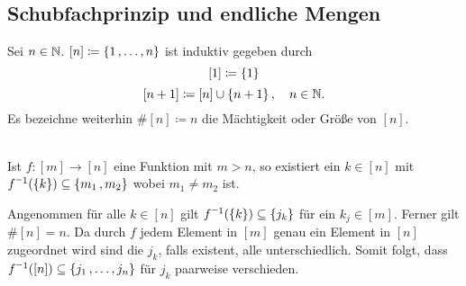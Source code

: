 \documentclass[../ana1.tex]{subfiles}
\begin{document}
\subsection{Schubfachprinzip und endliche Mengen}

\begin{notation}
	Sei \(n \in \mathbb{N} \). \([n] \coloneqq \{1 \operatorname{,} \ldots \operatorname{,} n\} \) ist induktiv gegeben durch
	\[[1] \coloneqq \{1\} \]
	\[[n + 1] \coloneqq [n] \cup \{n + 1\} \operatorname{,} \quad n \in \mathbb{N}.\]
	Es bezeichne weiterhin \(\#[n] \coloneqq n \) die Mächtigkeit oder Größe von \([n] \).
\end{notation}

\begin{satz*}[Schubfachprinzip]\label{satz:schubfach}\leavevmode \\
	Ist \(f \colon [m] \longrightarrow [n] \) eine Funktion mit \(m > n \), so existiert ein \(k \in [n]\) mit 
	\(\inverse{f}(\set{k}) \subseteq \set{m_1 \ko m_2} \) wobei \(m_1 \neq m_2 \) ist.
\end{satz*}
\begin{bew}
	Angenommen für alle \(k \in [n] \) gilt \(\inverse{f}(\set{k}) \subseteq \set{j_k} \) für ein \(k_j \in [m] \).
	Ferner gilt \(\#[n] = n \). Da durch \(f \) jedem Element in \([m] \) genau ein Element in \([n] \) zugeordnet wird
	sind die \(j_k \), falls existent, alle unterschiedlich.
	Somit folgt, dass \(\inverse{f}([n]) \subseteq \set{j_1 \ko \ldots \ko j_n} \) für \(j_k \) paarweise verschieden. 
\end{bew}
\end{document}
